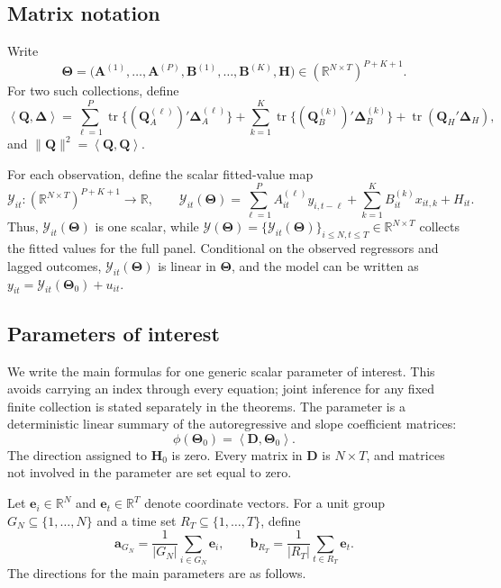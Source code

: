 \documentclass[11pt]{article}
\numberwithin{equation}{section}
\theoremstyle{remark}
\newcommand{\R}{\mathbb R}
\newcommand{\ip}[2]{\left\langle #1,#2\right\rangle}
\newcommand{\be}{\bm e}
\newcommand{\bA}{\bm A}
\newcommand{\bB}{\bm B}
\newcommand{\bD}{\bm D}
\newcommand{\bH}{\bm H}
\newcommand{\bQ}{\bm Q}
\newcommand{\bDelta}{\bm\Delta}
\newcommand{\bTheta}{\bm\Theta}
\begin{document}
\subsection{Matrix notation}

Write
$$
\bTheta
=
\bigl(
\bA^{(1)},\ldots,\bA^{(P)},
\bB^{(1)},\ldots,\bB^{(K)},
\bH
\bigr)
\in
\left(\R^{N\times T}\right)^{P+K+1}.
$$
For two such collections, define
$$
\ip{\bQ}{\bDelta}
=
\sum_{\ell=1}^{P}\operatorname{tr}\{(\bQ_A^{(\ell)})'\bDelta_A^{(\ell)}\}
+
\sum_{k=1}^{K}\operatorname{tr}\{(\bQ_B^{(k)})'\bDelta_B^{(k)}\}
+
\operatorname{tr}(\bQ_H'\bDelta_H),
$$
and $\|\bQ\|^2=\ip{\bQ}{\bQ}$.

For each observation, define the scalar fitted-value map
\begin{equation}
\label{eq:fitted_value}
\mathcal Y_{it}:
\left(\R^{N\times T}\right)^{P+K+1}
\longrightarrow
\R,
\qquad
\mathcal Y_{it}(\bTheta)
=
\sum_{\ell=1}^{P}A_{it}^{(\ell)}y_{i,t-\ell}
+
\sum_{k=1}^{K}B_{it}^{(k)}x_{it,k}
+
H_{it}.
\end{equation}
Thus, $\mathcal Y_{it}(\bTheta)$ is one scalar, while
$
\mathcal Y(\bTheta)
=
\{\mathcal Y_{it}(\bTheta)\}_{i\le N,t\le T}
\in\R^{N\times T}
$
collects the fitted values for the full panel. Conditional on the observed regressors and lagged outcomes, $\mathcal Y_{it}(\bTheta)$ is linear in $\bTheta$, and the model can be written as $y_{it}=\mathcal Y_{it}(\bTheta_0)+u_{it}$.

\subsection{Parameters of interest}

We write the main formulas for one generic scalar parameter of interest. This avoids carrying an index through every equation; joint inference for any fixed finite collection is stated separately in the theorems. The parameter is a deterministic linear summary of the autoregressive and slope coefficient matrices:
\begin{equation}
\label{eq:target}
\phi(\bTheta_0)=\ip{\bD}{\bTheta_0}.
\end{equation}
The direction assigned to $\bH_0$ is zero. Every matrix in $\bD$ is $N\times T$, and matrices not involved in the parameter are set equal to zero.

Let $\be_i\in\R^N$ and $\be_t\in\R^T$ denote coordinate vectors. For a unit group $G_N\subseteq\{1,\ldots,N\}$ and a time set $R_T\subseteq\{1,\ldots,T\}$, define
$$
\bm a_{G_N}
=
\frac{1}{|G_N|}
\sum_{i\in G_N}\be_i,
\qquad
\bm b_{R_T}
=
\frac{1}{|R_T|}
\sum_{t\in R_T}\be_t.
$$
The directions for the main parameters are as follows.
\end{document}
